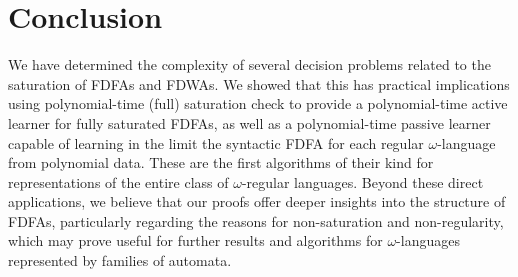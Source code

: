 \documentclass[a4paper,USenglish,cleveref,autoref,thm-restate]{lipics-v2021}
\begin{document}
 \section{Conclusion}
\label{section:conclusion}
We have determined the complexity of several decision problems related to the saturation of FDFAs and FDWAs.
We showed that this has practical implications using polynomial-time (full) saturation check to provide a polynomial-time active learner for fully saturated FDFAs, as well as a polynomial-time passive learner capable of learning in the limit the syntactic FDFA for each regular $\omega$-language from polynomial data.
These are the first algorithms of their kind for representations of the entire class of $\omega$-regular languages.
Beyond these direct applications, we believe that our proofs offer deeper insights into the structure of FDFAs, particularly regarding the reasons for non-saturation and non-regularity, which may prove useful for further results and algorithms for $\omega$-languages represented by families of automata. 
\end{document}
